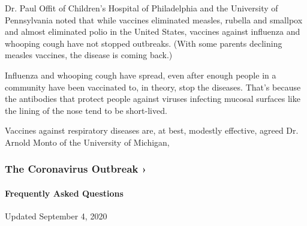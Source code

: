 Dr. Paul Offit of Children's Hospital of Philadelphia and the University
of Pennsylvania noted that while vaccines eliminated measles, rubella
and smallpox and almost eliminated polio in the United States, vaccines
against influenza and whooping cough have not stopped outbreaks. (With
some parents declining measles vaccines, the disease is coming back.)

Influenza and whooping cough have spread, even after enough people in a
community have been vaccinated to, in theory, stop the diseases. That's
because the antibodies that protect people against viruses infecting
mucosal surfaces like the lining of the nose tend to be short-lived.

Vaccines against respiratory diseases are, at best, modestly effective,
agreed Dr. Arnold Monto of the University of Michigan,

\href{https://www.nytimes3xbfgragh.onion/news-event/coronavirus?action=click\&pgtype=Article\&state=default\&region=MAIN_CONTENT_3\&context=storylines_faq}{}

\hypertarget{the-coronavirus-outbreak-}{%
\subsubsection{The Coronavirus Outbreak
›}\label{the-coronavirus-outbreak-}}

\hypertarget{frequently-asked-questions}{%
\paragraph{Frequently Asked
Questions}\label{frequently-asked-questions}}

Updated September 4, 2020

